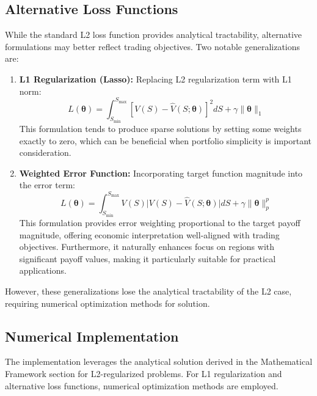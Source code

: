 \documentclass[12pt]{article}
\begin{document}
\subsection{Alternative Loss Functions}
While the standard L2 loss function provides analytical tractability, alternative 
formulations may better reflect trading objectives. Two notable generalizations are:

\begin{enumerate}
    \item \textbf{L1 Regularization (Lasso):} Replacing L2 regularization term with L1 norm:
    \begin{equation}
        L(\boldsymbol{\theta}) = 
            \int_{S_{\min}}^{S_{\max}} 
                \left[ V(S) - \hat{V}(S;\boldsymbol{\theta}) \right]^2 dS + 
            \gamma \|\boldsymbol{\theta}\|_1
    \end{equation}
    This formulation tends to produce sparse solutions by setting some weights exactly 
    to zero, which can be beneficial when portfolio simplicity is important consideration.

    \item \textbf{Weighted Error Function:} Incorporating target function magnitude 
    into the error term:
    \begin{equation}
        L(\boldsymbol{\theta}) = 
            \int_{S_{\min}}^{S_{\max}} 
                V(S) \Big| V(S) - \hat{V}(S;\boldsymbol{\theta}) \Big| dS + 
            \gamma \|\boldsymbol{\theta}\|_p^p
    \end{equation}
    This formulation provides error weighting proportional to the target payoff magnitude, 
    offering economic interpretation well-aligned with trading objectives. Furthermore, it 
    naturally enhances focus on regions with significant payoff values, making it particularly 
    suitable for practical applications.
\end{enumerate}

However, these generalizations lose the analytical tractability of the L2 case, 
requiring numerical optimization methods for solution.

\subsection{Numerical Implementation}
The implementation leverages the analytical solution derived in the Mathematical Framework 
section for L2-regularized problems. For L1 regularization and alternative loss functions, 
numerical optimization methods are employed.
\end{document}
